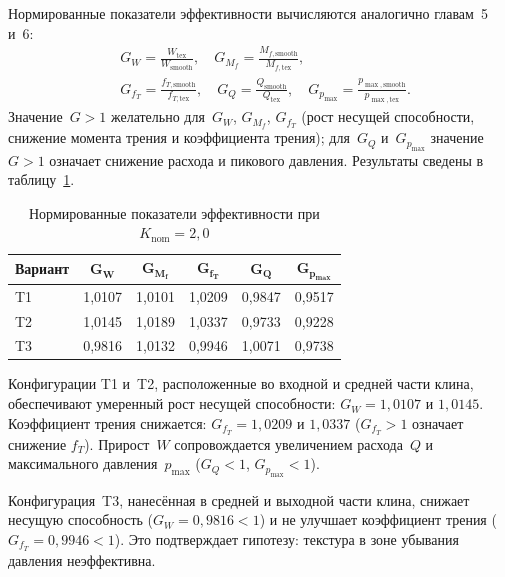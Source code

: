 Нормированные показатели эффективности вычисляются аналогично
главам~5 и~6:
\begin{equation}
\begin{split}
  &G_W = \frac{W_{\mathrm{tex}}}{W_{\mathrm{smooth}}}, \quad
  G_{M_f} = \frac{M_{f,\mathrm{smooth}}}{M_{f,\mathrm{tex}}}, \\
  &G_{f_T} = \frac{f_{T,\mathrm{smooth}}}{f_{T,\mathrm{tex}}}, \quad
  G_Q = \frac{Q_{\mathrm{smooth}}}{Q_{\mathrm{tex}}}, \quad
  G_{p_{\max}} = \frac{p_{\max,\mathrm{smooth}}}{p_{\max,\mathrm{tex}}}.
\end{split}
  \label{eq:thrust_gains}
\end{equation}
Значение~$G > 1$ желательно для~$G_W$, $G_{M_f}$, $G_{f_T}$
(рост несущей способности, снижение момента трения и коэффициента
трения); для~$G_Q$ и~$G_{p_{\max}}$ значение~$G > 1$ означает
снижение расхода и пикового давления. Результаты сведены
в таблицу~\ref{tab:thrust_gains}.

\begin{table}[!ht]
\centering
\caption{Нормированные показатели эффективности
  при $K_{\mathrm{nom}} = 2{,}0$}
\label{tab:thrust_gains}
\begin{tabularx}{\textwidth}{|X|c|c|c|c|c|}
\hline
\multicolumn{1}{|c|}{\textbf{Вариант}}
  & $\boldsymbol{G_W}$
  & $\boldsymbol{G_{M_f}}$
  & $\boldsymbol{G_{f_T}}$
  & $\boldsymbol{G_Q}$
  & $\boldsymbol{G_{p_{\max}}}$ \\
\hline
T1 & 1{,}0107 & 1{,}0101 & 1{,}0209 & 0{,}9847 & 0{,}9517 \\
\hline
T2 & 1{,}0145 & 1{,}0189 & 1{,}0337 & 0{,}9733 & 0{,}9228 \\
\hline
T3 & 0{,}9816 & 1{,}0132 & 0{,}9946 & 1{,}0071 & 0{,}9738 \\
\hline
\end{tabularx}
\end{table}

\FloatBarrier

Конфигурации T1 и~T2, расположенные во входной и средней части
клина, обеспечивают умеренный рост несущей способности:
$G_W = 1{,}0107$ и $1{,}0145$. Коэффициент трения снижается:
$G_{f_T} = 1{,}0209$ и $1{,}0337$ ($G_{f_T} > 1$ означает снижение
$f_T$). Прирост~$W$ сопровождается увеличением расхода~$Q$
и максимального давления~$p_{\max}$
($G_Q < 1$, $G_{p_{\max}} < 1$).

Конфигурация~T3, нанесённая в средней и выходной части клина,
снижает несущую способность ($G_W = 0{,}9816 < 1$) и не улучшает
коэффициент трения ($G_{f_T} = 0{,}9946 < 1$). Это подтверждает
гипотезу: текстура в зоне убывания давления неэффективна.

